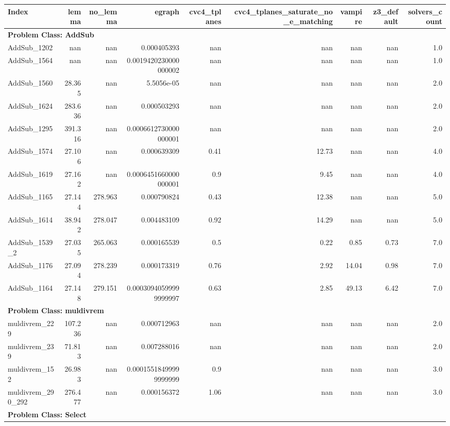 \begin{tabular}{lrrrrrrrr}
\toprule
Index & lemma & no\_lemma & egraph & cvc4\_tplanes & cvc4\_tplanes\_saturate\_no\_e\_matching & vampire & z3\_default & solvers\_count \\
\midrule
\midrule
\multicolumn{9}{l}{\textbf{Problem Class: AddSub}} \\
\midrule
AddSub\_1202 & nan & nan & 0.000405393 & nan & nan & nan & nan & 1.0 \\
AddSub\_1564 & nan & nan & 0.0019420230000000002 & nan & nan & nan & nan & 1.0 \\
AddSub\_1560 & 28.365 & nan & 5.5056e-05 & nan & nan & nan & nan & 2.0 \\
AddSub\_1624 & 283.636 & nan & 0.000503293 & nan & nan & nan & nan & 2.0 \\
AddSub\_1295 & 391.316 & nan & 0.0006612730000000001 & nan & nan & nan & nan & 2.0 \\
AddSub\_1574 & 27.106 & nan & 0.000639309 & 0.41 & 12.73 & nan & nan & 4.0 \\
AddSub\_1619 & 27.162 & nan & 0.0006451660000000001 & 0.9 & 9.45 & nan & nan & 4.0 \\
AddSub\_1165 & 27.144 & 278.963 & 0.000790824 & 0.43 & 12.38 & nan & nan & 5.0 \\
AddSub\_1614 & 38.942 & 278.047 & 0.004483109 & 0.92 & 14.29 & nan & nan & 5.0 \\
AddSub\_1539\_2 & 27.035 & 265.063 & 0.000165539 & 0.5 & 0.22 & 0.85 & 0.73 & 7.0 \\
AddSub\_1176 & 27.094 & 278.239 & 0.000173319 & 0.76 & 2.92 & 14.04 & 0.98 & 7.0 \\
AddSub\_1164 & 27.148 & 279.151 & 0.00030940599999999997 & 0.63 & 2.85 & 49.13 & 6.42 & 7.0 \\
\midrule
\multicolumn{9}{l}{\textbf{Problem Class: muldivrem}} \\
\midrule
muldivrem\_229 & 107.236 & nan & 0.000712963 & nan & nan & nan & nan & 2.0 \\
muldivrem\_239 & 71.813 & nan & 0.007288016 & nan & nan & nan & nan & 2.0 \\
muldivrem\_152 & 26.983 & nan & 0.00015518499999999999 & 0.9 & nan & nan & nan & 3.0 \\
muldivrem\_290\_292 & 276.477 & nan & 0.000156372 & 1.06 & nan & nan & nan & 3.0 \\
\midrule
\multicolumn{9}{l}{\textbf{Problem Class: Select}} \\

\end{tabular}
